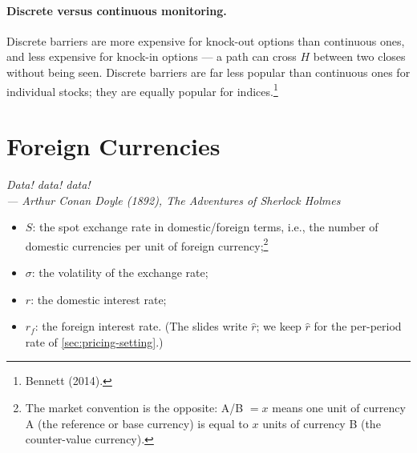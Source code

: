 \paragraph{Discrete versus continuous monitoring.}
Discrete barriers are more expensive for knock-out options than continuous ones, and less expensive for knock-in options --- a path can cross $H$ between two closes without being seen.
Discrete barriers are far less popular than continuous ones for individual stocks; they are equally popular for indices.\footnote{Bennett (2014).}

\suppstart
{}
\suppend

\section{Foreign Currencies}
\label{sec:forex}


\begin{flushright}
	\itshape Data! data! data!\\
	\upshape --- Arthur Conan Doyle (1892), \itshape The Adventures of Sherlock Holmes
\end{flushright}

\begin{notation}
	\begin{itemize}[nosep]
		\item $S$: the spot exchange rate in domestic/foreign terms, i.e., the number of domestic currencies per unit of foreign currency;\footnote{The market convention is the opposite: A/B $=x$ means one unit of currency A (the reference or base currency) is equal to $x$ units of currency B (the counter-value currency).}
		\item $\sigma$: the volatility of the exchange rate;
		\item $r$: the domestic interest rate;
		\item $r_{f}$: the foreign interest rate. (The slides write $\hat{r}$; we keep $\hat{r}$ for the per-period rate of \autoref{sec:pricing-setting}.)
	\end{itemize}
\end{notation}

